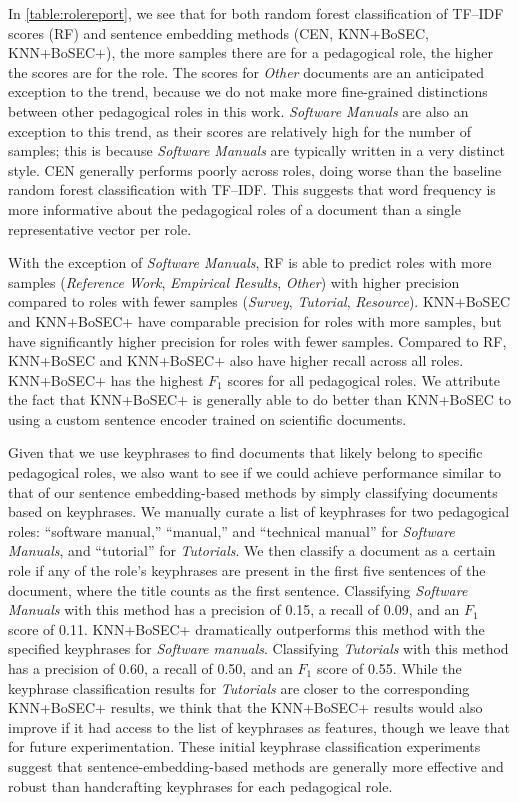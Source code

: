 \documentclass[11pt,a4paper]{article}
\begin{document}
In \autoref{table:rolereport}, we see that for both random forest classification of TF--IDF scores (RF) and sentence embedding methods (CEN, KNN+BoSEC, KNN+BoSEC+), the more samples there are for a pedagogical role, the higher the scores are for the role. The scores for \textit{Other} documents are an anticipated exception to the trend, because we do not make more fine-grained distinctions between other pedagogical roles in this work. \textit{Software Manuals} are also an exception to this trend, as their scores are relatively high for the number of samples; this is because \textit{Software Manuals} are typically written in a very distinct style. CEN generally performs poorly across roles, doing worse than the baseline random forest classification with TF--IDF. This suggests that word frequency is more informative about the pedagogical roles of a document than a single representative vector per role.

With the exception of \textit{Software Manuals}, RF is able to predict roles with more samples (\textit{Reference Work}, \textit{Empirical Results}, \textit{Other}) with higher precision compared to roles with fewer samples (\textit{Survey}, \textit{Tutorial}, \textit{Resource}). KNN+BoSEC and KNN+BoSEC+ have comparable precision for roles with more samples, but have significantly higher precision for roles with fewer samples. Compared to RF, KNN+BoSEC and KNN+BoSEC+ also have higher recall across all roles. KNN+BoSEC+ has the highest $F_1$ scores for all pedagogical roles. We attribute the fact that KNN+BoSEC+ is generally able to do better than KNN+BoSEC to using a custom sentence encoder trained on scientific documents.

Given that we use keyphrases to find documents that likely belong to specific pedagogical roles, we also want to see if we could achieve performance similar to that of our sentence embedding-based methods by simply classifying documents based on keyphrases. We manually curate a list of keyphrases for two pedagogical roles: ``software manual,'' ``manual,'' and ``technical manual'' for \textit{Software Manuals}, and ``tutorial'' for \textit{Tutorials}. We then classify a document as a certain role if any of the role's keyphrases are present in the first five sentences of the document, where the title counts as the first sentence. Classifying \textit{Software Manuals} with this method has a precision of 0.15, a recall of 0.09, and an $F_1$ score of 0.11. KNN+BoSEC+ dramatically outperforms this method with the specified keyphrases for \textit{Software manuals}. Classifying \textit{Tutorials} with this method has a precision of 0.60, a recall of 0.50, and an $F_1$ score of 0.55. While the keyphrase classification results for \textit{Tutorials} are closer to the corresponding KNN+BoSEC+ results, we think that the KNN+BoSEC+ results would also improve if it had access to the list of keyphrases as features, though we leave that for future experimentation. These initial keyphrase classification experiments suggest that sentence-embedding-based methods are generally more effective and robust than handcrafting keyphrases for each pedagogical role.
\end{document}
